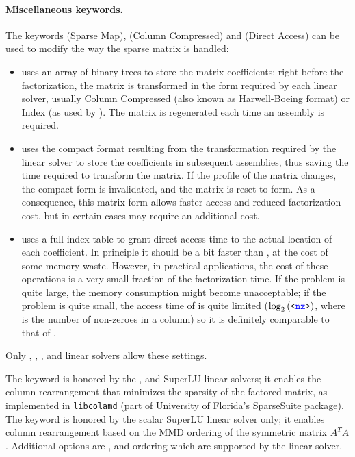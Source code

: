 \paragraph{Miscellaneous keywords.}
The keywords  (Sparse Map),  (Column Compressed)
and  (Direct Access) can be used to modify the way
the sparse matrix is handled:
\begin{itemize}
\item {} uses an array of binary trees to store the matrix
coefficients; right before the factorization, the matrix is transformed
in the form required by each linear solver, usually Column Compressed
(also known as Harwell-Boeing format) or Index (as used by ).
The matrix is regenerated each time an assembly is required.
\item {} uses the compact format resulting from the transformation
required by the linear solver to store the coefficients
in subsequent assemblies,
thus saving the time required to transform the matrix.
If the profile of the matrix changes, the compact form is invalidated,
and the matrix is reset to  form.  As a consequence, this matrix
form allows faster access and reduced factorization cost, but in certain
cases may require an additional cost.
\item {} uses a full index table to grant direct access time to
the actual location of each coefficient.
In principle it should be a bit faster than , at the cost
of some memory waste.
However, in practical applications, the cost of these operations
is a very small fraction of the factorization time.
If the problem is quite large, the memory consumption might
become unacceptable; if the problem is quite small, the access time
of  is quite limited ($\log_2\left( \texttt{<\textcolor{blue}{nz}>} \right)$, where
 is the number of non-zeroes in a column) so it is definitely
comparable to that of .
\end{itemize}
Only , , ,  and 
linear solvers allow these settings.

The keyword  is honored by the ,  and SuperLU linear solvers;
it enables the column rearrangement that minimizes the sparsity
of the factored matrix, as implemented in \texttt{libcolamd}
(part of University of Florida's SparseSuite package).
The keyword  is honored by 
the scalar SuperLU linear solver only; it enables column rearrangement
based on the MMD ordering of the symmetric matrix $A^T A$.
Additional options are ,  and  ordering which are supported by the  linear solver.


